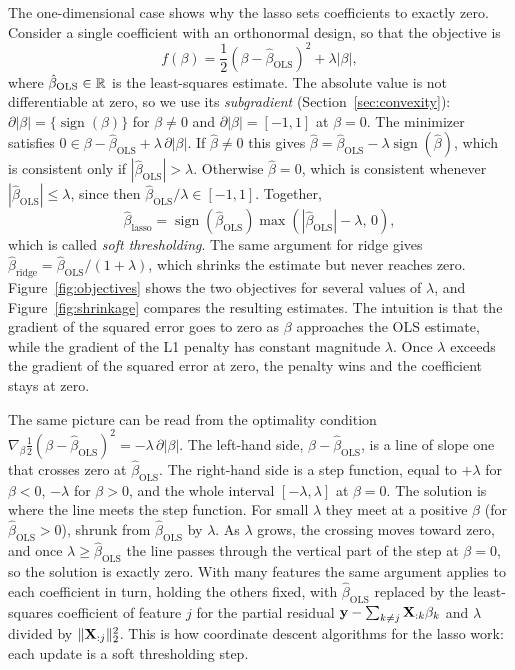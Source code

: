 The one-dimensional case shows why the lasso sets coefficients to exactly zero. Consider a single coefficient with an orthonormal design, so that the objective is
\begin{equation}
  f(\beta) = \frac{1}{2}\left(\beta-\hat\beta_{\text{OLS}}\right)^2 + \lambda|\beta| ,
\end{equation}
where $\hat\beta_{\text{OLS}}\in\mathbb{R}$ is the least-squares estimate. The absolute value is not differentiable at zero, so we use its \emph{subgradient} (Section~\ref{sec:convexity}): $\partial|\beta|=\{\operatorname{sign}(\beta)\}$ for $\beta\neq 0$ and $\partial|\beta|=[-1,1]$ at $\beta=0$. The minimizer satisfies $0\in\beta-\hat\beta_{\text{OLS}}+\lambda\,\partial|\beta|$. If $\hat\beta\neq 0$ this gives $\hat\beta=\hat\beta_{\text{OLS}}-\lambda\operatorname{sign}(\hat\beta)$, which is consistent only if $|\hat\beta_{\text{OLS}}|>\lambda$. Otherwise $\hat\beta=0$, which is consistent whenever $|\hat\beta_{\text{OLS}}|\leq\lambda$, since then $\hat\beta_{\text{OLS}}/\lambda\in[-1,1]$. Together,
\begin{equation}
  \hat\beta_{\text{lasso}} = \operatorname{sign}(\hat\beta_{\text{OLS}})\max\left(|\hat\beta_{\text{OLS}}|-\lambda,\,0\right),
\end{equation}
which is called \emph{soft thresholding}. The same argument for ridge gives $\hat\beta_{\text{ridge}}=\hat\beta_{\text{OLS}}/(1+\lambda)$, which shrinks the estimate but never reaches zero. Figure~\ref{fig:objectives} shows the two objectives for several values of $\lambda$, and Figure~\ref{fig:shrinkage} compares the resulting estimates. The intuition is that the gradient of the squared error goes to zero as $\beta$ approaches the OLS estimate, while the gradient of the L1 penalty has constant magnitude $\lambda$. Once $\lambda$ exceeds the gradient of the squared error at zero, the penalty wins and the coefficient stays at zero.

The same picture can be read from the optimality condition $\nabla_\beta\frac{1}{2}(\beta-\hat\beta_{\text{OLS}})^2=-\lambda\,\partial|\beta|$. The left-hand side, $\beta-\hat\beta_{\text{OLS}}$, is a line of slope one that crosses zero at $\hat\beta_{\text{OLS}}$. The right-hand side is a step function, equal to $+\lambda$ for $\beta<0$, $-\lambda$ for $\beta>0$, and the whole interval $[-\lambda,\lambda]$ at $\beta=0$. The solution is where the line meets the step function. For small $\lambda$ they meet at a positive $\beta$ (for $\hat\beta_{\text{OLS}}>0$), shrunk from $\hat\beta_{\text{OLS}}$ by $\lambda$. As $\lambda$ grows, the crossing moves toward zero, and once $\lambda\geq\hat\beta_{\text{OLS}}$ the line passes through the vertical part of the step at $\beta=0$, so the solution is exactly zero. With many features the same argument applies to each coefficient in turn, holding the others fixed, with $\hat\beta_{\text{OLS}}$ replaced by the least-squares coefficient of feature $j$ for the partial residual $\mathbf{y}-\sum_{k\neq j}\mathbf{X}_{:k}\beta_k$ and $\lambda$ divided by $\|\mathbf{X}_{:j}\|_2^2$. This is how coordinate descent algorithms for the lasso work: each update is a soft thresholding step.

